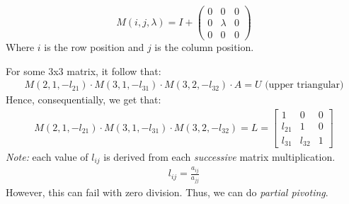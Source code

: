\documentclass{article}
\begin{document}
\[
M(i, j, \lambda) = I + 
\begin{pmatrix}
0 & 0 & 0 \\
0 & \lambda & 0 \\
0 & 0 & 0
\end{pmatrix}
\]
Where $i$ is the row position and $j$ is the column position.

For some 3x3 matrix, it follow that:
\begin{align*}
  M(2, 1, -l_{21}) \cdot M(3, 1, -l_{31}) \cdot M(3, 2, -l_{32}) \cdot A = U \text{  (upper triangular)}
\end{align*}
Hence, consequentially, we get that:
\begin{align*}
  M(2, 1, -l_{21}) \cdot M(3, 1, -l_{31}) \cdot M(3, 2, -l_{32}) = L = \begin{bmatrix}
    1 & 0 & 0 \\
    l_{21} & 1 & 0\\
    l_{31} & l_{32} & 1
  \end{bmatrix}
\end{align*}
\textit{Note:} each value of $l_{ij}$ is derived from each \textit{successive} matrix multiplication.
\begin{align*}
  l_{ij} = \frac{a_{ij}}{a_{jj}}
\end{align*}
However, this can fail with zero division. Thus, we can do \textit{partial pivoting}.
\end{document}
